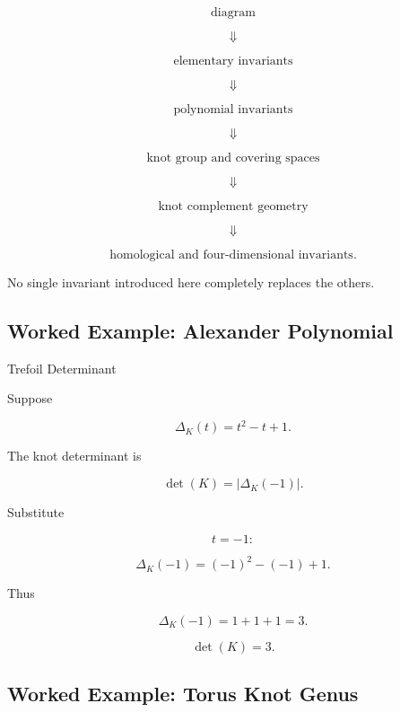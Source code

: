 \[
\boxed{
\text{diagram}
}
\]

\[
\Downarrow
\]

\[
\boxed{
\text{elementary invariants}
}
\]

\[
\Downarrow
\]

\[
\boxed{
\text{polynomial invariants}
}
\]

\[
\Downarrow
\]

\[
\boxed{
\text{knot group and covering spaces}
}
\]

\[
\Downarrow
\]

\[
\boxed{
\text{knot complement geometry}
}
\]

\[
\Downarrow
\]

\[
\boxed{
\text{homological and four-dimensional invariants}.
}
\]

No single invariant introduced here completely replaces the others.

\subsection{Worked Example: Alexander Polynomial}
\label{subsec:worked-alexander-polynomial}

\begin{workedexamplebox}{Trefoil Determinant}

Suppose

\[
\Delta_K(t)=t^2-t+1.
\]

The knot determinant is

\[
\det(K)
=
|\Delta_K(-1)|.
\]

Substitute

\[
t=-1:
\]

\[
\Delta_K(-1)
=
(-1)^2-(-1)+1.
\]

Thus

\[
\Delta_K(-1)
=
1+1+1
=
3.
\]

\begin{answerbox}
\[
\boxed{
\det(K)=3.
}
\]
\end{answerbox}
\end{workedexamplebox}

\subsection{Worked Example: Torus Knot Genus}
\label{subsec:worked-torus-knot-genus}

